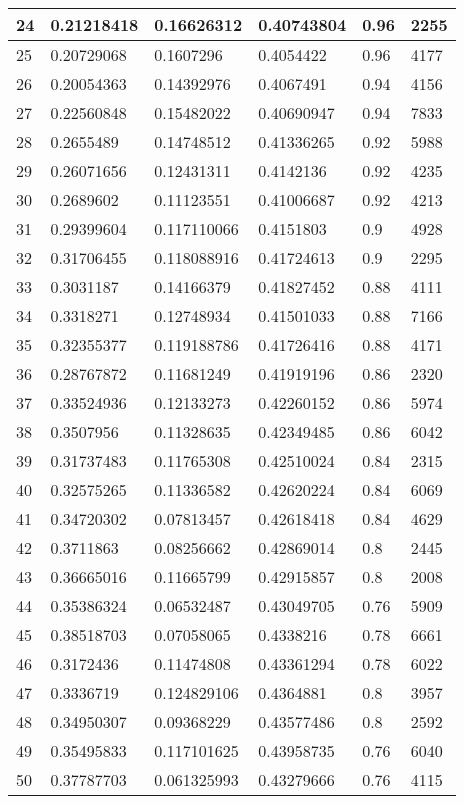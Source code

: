 \begin{longtable}{|l|l|l|l|l|l|}
24 & 0.21218418 & 0.16626312 & 0.40743804 & 0.96 & 2255 \\ \hline 
25 & 0.20729068 & 0.1607296 & 0.4054422 & 0.96 & 4177 \\ \hline 
26 & 0.20054363 & 0.14392976 & 0.4067491 & 0.94 & 4156 \\ \hline 
27 & 0.22560848 & 0.15482022 & 0.40690947 & 0.94 & 7833 \\ \hline 
28 & 0.2655489 & 0.14748512 & 0.41336265 & 0.92 & 5988 \\ \hline 
29 & 0.26071656 & 0.12431311 & 0.4142136 & 0.92 & 4235 \\ \hline 
30 & 0.2689602 & 0.11123551 & 0.41006687 & 0.92 & 4213 \\ \hline 
31 & 0.29399604 & 0.117110066 & 0.4151803 & 0.9 & 4928 \\ \hline 
32 & 0.31706455 & 0.118088916 & 0.41724613 & 0.9 & 2295 \\ \hline 
33 & 0.3031187 & 0.14166379 & 0.41827452 & 0.88 & 4111 \\ \hline 
34 & 0.3318271 & 0.12748934 & 0.41501033 & 0.88 & 7166 \\ \hline 
35 & 0.32355377 & 0.119188786 & 0.41726416 & 0.88 & 4171 \\ \hline 
36 & 0.28767872 & 0.11681249 & 0.41919196 & 0.86 & 2320 \\ \hline 
37 & 0.33524936 & 0.12133273 & 0.42260152 & 0.86 & 5974 \\ \hline 
38 & 0.3507956 & 0.11328635 & 0.42349485 & 0.86 & 6042 \\ \hline 
39 & 0.31737483 & 0.11765308 & 0.42510024 & 0.84 & 2315 \\ \hline 
40 & 0.32575265 & 0.11336582 & 0.42620224 & 0.84 & 6069 \\ \hline 
41 & 0.34720302 & 0.07813457 & 0.42618418 & 0.84 & 4629 \\ \hline 
42 & 0.3711863 & 0.08256662 & 0.42869014 & 0.8 & 2445 \\ \hline 
43 & 0.36665016 & 0.11665799 & 0.42915857 & 0.8 & 2008 \\ \hline 
44 & 0.35386324 & 0.06532487 & 0.43049705 & 0.76 & 5909 \\ \hline 
45 & 0.38518703 & 0.07058065 & 0.4338216 & 0.78 & 6661 \\ \hline 
46 & 0.3172436 & 0.11474808 & 0.43361294 & 0.78 & 6022 \\ \hline 
47 & 0.3336719 & 0.124829106 & 0.4364881 & 0.8 & 3957 \\ \hline 
48 & 0.34950307 & 0.09368229 & 0.43577486 & 0.8 & 2592 \\ \hline 
49 & 0.35495833 & 0.117101625 & 0.43958735 & 0.76 & 6040 \\ \hline 
50 & 0.37787703 & 0.061325993 & 0.43279666 & 0.76 & 4115 \\ \hline 
\end{longtable}